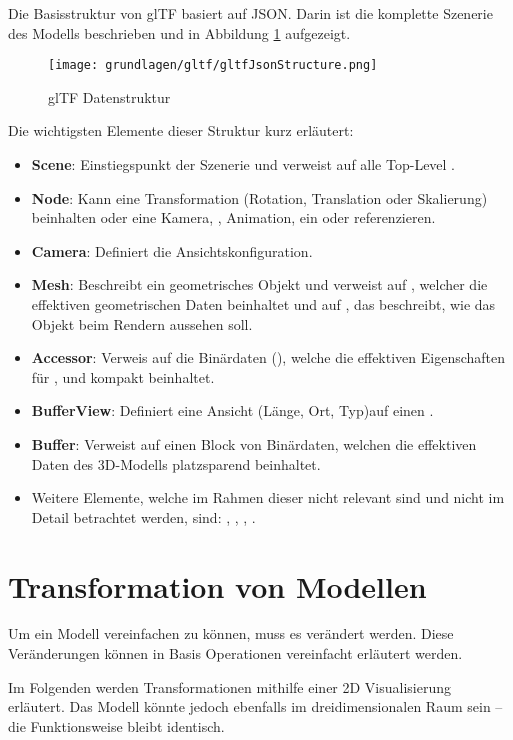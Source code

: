 Die Basisstruktur von glTF basiert auf JSON. Darin ist die komplette Szenerie des Modells beschrieben und in Abbildung \ref{fig:gltfDatastructure} aufgezeigt.\cite{gltf1Spec}
\begin{figure}[H]
  \centering
  \texttt{[image: grundlagen/gltf/gltfJsonStructure.png]}
  \caption{glTF Datenstruktur \cite{gltf1Spec}}
  \label{fig:gltfDatastructure}
\end{figure}

Die wichtigsten Elemente dieser Struktur kurz erläutert:
\begin{itemize}
  \item \textbf{Scene}: Einstiegspunkt der Szenerie und verweist auf alle Top-Level .
  \item \textbf{Node}: Kann eine Transformation (Rotation, Translation oder Skalierung) beinhalten oder eine Kamera, , Animation, ein  oder  referenzieren.
  \item  \textbf{Camera}: Definiert die Ansichtskonfiguration.
  \item  \textbf{Mesh}: Beschreibt ein geometrisches Objekt und verweist auf , welcher die effektiven geometrischen Daten beinhaltet und auf , das beschreibt, wie das Objekt beim Rendern aussehen soll.
  \item \textbf{Accessor}: Verweis auf die Binärdaten (), welche die effektiven Eigenschaften für ,  und  kompakt beinhaltet.
  \item \textbf{BufferView}: Definiert eine Ansicht (Länge, Ort, Typ)auf einen .
  \item \textbf{Buffer}: Verweist auf einen Block von Binärdaten, welchen die effektiven Daten des 3D-Modells platzsparend beinhaltet.
  \item Weitere Elemente, welche im Rahmen dieser nicht relevant sind und nicht im Detail betrachtet werden, sind: , , , .
\end{itemize}

\section{Transformation von Modellen}

Um ein Modell vereinfachen zu können, muss es verändert werden.
Diese Veränderungen können in Basis Operationen vereinfacht erläutert werden.

Im Folgenden werden Transformationen mithilfe einer 2D Visualisierung erläutert. Das Modell könnte jedoch ebenfalls im dreidimensionalen Raum sein – die Funktionsweise bleibt identisch.

